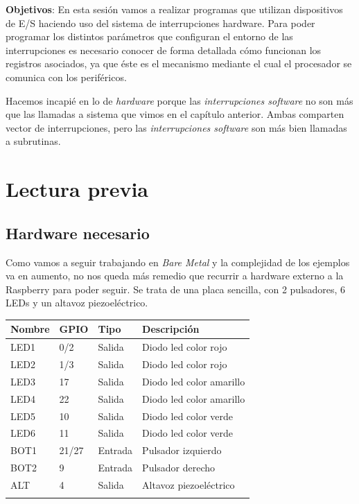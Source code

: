 

\label{chp:Interrupciones}
\minitoc

{\bf Objetivos}: En esta sesión vamos a realizar programas que
utilizan dispositivos de E/S haciendo uso del sistema de
interrupciones hardware. Para poder programar los distintos parámetros
que configuran el entorno de las interrupciones es necesario conocer de
forma detallada cómo funcionan los registros asociados, ya que
éste es el mecanismo mediante el cual el procesador se
comunica con los periféricos.

Hacemos incapié en lo de {\it hardware} porque las
{\it interrupciones software} no son más que las llamadas a sistema
que vimos en el capítulo anterior. Ambas comparten vector de interrupciones,
pero las {\it interrupciones software} son más bien llamadas a subrutinas.

\section{Lectura previa}

\subsection{Hardware necesario}

Como vamos a seguir trabajando en {\it Bare Metal} y la complejidad
de los ejemplos va en aumento, no nos queda más remedio que
recurrir a hardware externo a la Raspberry para poder seguir. Se
trata de una placa sencilla, con 2 pulsadores, 6 LEDs y un altavoz
piezoeléctrico.

\begin{longtable}{ p{1.8cm} | p{1.2cm} | p{2cm} | p{5cm}}
\hline
{\bf Nombre} & {\bf GPIO} & {\bf Tipo} & {\bf Descripción} \\ \hline
LED1 & 0/2 & Salida & Diodo led color rojo \\ \hline
LED2 & 1/3 & Salida & Diodo led color rojo \\ \hline
LED3 & 17 & Salida & Diodo led color amarillo \\ \hline
LED4 & 22 & Salida & Diodo led color amarillo \\ \hline
LED5 & 10 & Salida & Diodo led color verde \\ \hline
LED6 & 11 & Salida & Diodo led color verde \\ \hline
BOT1 & 21/27 & Entrada & Pulsador izquierdo \\ \hline
BOT2 & 9 & Entrada & Pulsador derecho \\ \hline
ALT & 4 & Salida & Altavoz piezoeléctrico \\ \hline
\label{tab:berry}
\end{longtable}

